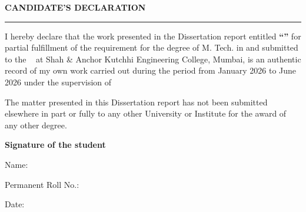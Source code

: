 \thispagestyle{empty}

\begin{center}
{\Large {\bf \uppercase{Candidate's Declaration}}}
\end{center}

\vspace{\baselineskip}
\hrule
\vspace{2\baselineskip}

I hereby declare that the work presented in the Dissertation report entitled {\textbf{{“\mytitle”}}} for partial fulfillment of the requirement for the degree of M. Tech. in \branch \hspace{0.025cm} and submitted to the \mydep~ at Shah \& Anchor Kutchhi Engineering College, Mumbai, is an
authentic record of my own work carried out during the period from January 2026 to June 2026 under the supervision of {\textbf{\mysupervisor}} \par
\vspace{2\baselineskip}
The matter presented in this Dissertation report has not been submitted elsewhere in part or fully to any other University or
Institute for the award of any other degree.


\bigskip


\bigskip


\bigskip

{\textbf{Signature of the student \ \ \ \ \ \ }}

{Name: \myname} \par
Permanent Roll No.: {\myrollno}


Date: 